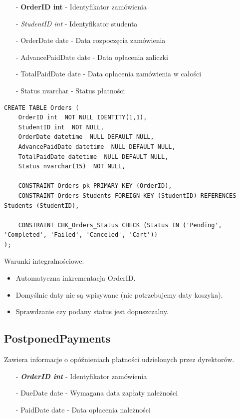 \documentclass[11pt,a4paper]{article}
\begin{document}
\begin{itemize}
    \item[-] \textbf{OrderID int} - Identyfikator zamówienia
    \item[-] \textit{StudentID int} - Identyfikator studenta
    \item[-] OrderDate date - Data rozpoczęcia zamówienia
    \item[-] AdvancePaidDate date - Data opłacenia zaliczki
    \item[-] TotalPaidDate date - Data opłacenia zamówienia w całości
    \item[-] Status nvarchar - Status płatności    
\end{itemize}

\begin{Verbatim}[breaklines=true]
CREATE TABLE Orders (
    OrderID int  NOT NULL IDENTITY(1,1),
    StudentID int  NOT NULL,
    OrderDate datetime  NULL DEFAULT NULL,
    AdvancePaidDate datetime  NULL DEFAULT NULL,
    TotalPaidDate datetime  NULL DEFAULT NULL,
    Status nvarchar(15)  NOT NULL,

    CONSTRAINT Orders_pk PRIMARY KEY (OrderID),
    CONSTRAINT Orders_Students FOREIGN KEY (StudentID) REFERENCES Students (StudentID),

    CONSTRAINT CHK_Orders_Status CHECK (Status IN ('Pending', 'Completed', 'Failed', 'Canceled', 'Cart'))
);
\end{Verbatim}

Warunki integralnościowe:
\begin{itemize}
    \item Automatyczna inkrementacja OrderID.
    \item Domyślnie daty nie są wpisywane (nie potrzebujemy daty koszyka).
    \item Sprawdzanie czy podany status jest dopuszczalny.
\end{itemize}

\subsection{PostponedPayments}
Zawiera informacje o opóźnieniach płatności udzielonych przez dyrektorów.

\begin{itemize}
    \item[-] \textbf{\textit{OrderID int}} - Identyfikator zamówienia
    \item[-] DueDate date - Wymagana data zapłaty należności
    \item[-] PaidDate date - Data opłacenia należności
\end{itemize}
\end{document}
